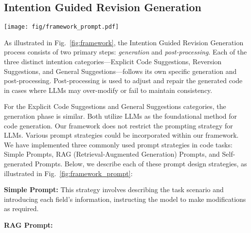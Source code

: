 
\subsection{Intention Guided Revision Generation}


\begin{figure*}[!t]
\centering
\texttt{[image: fig/framework\_prompt.pdf]}
\vspace{-2mm}
\caption{The format of the used prompt in the generation.}
\label{fig:framework_prompt}
\vspace{-4mm}
\end{figure*}

As illustrated in Fig.~\ref{fig:framework}, the Intention Guided Revision Generation process consists of two primary steps: \textit{generation} and \textit{post-processing}. Each of the three distinct intention categories—Explicit Code Suggestions, Reversion Suggestions, and General Suggestions—follows its own specific generation and post-processing. Post-processing is used to adjust and repair the generated code in cases where LLMs may over-modify or fail to maintain consistency.

For the Explicit Code Suggestions and General Suggestions categories, the generation phase is similar. Both utilize LLMs as the foundational method for code generation. Our framework does not restrict the prompting strategy for LLMs. Various prompt strategies could be incorporated within our framework. We have implemented three commonly used prompt strategies in code tasks: Simple Prompts, RAG (Retrieval-Augmented Generation) Prompts, and Self-generated Prompts. Below, we describe each of these prompt design strategies, as illustrated in Fig.~\ref{fig:framework_prompt}:

\noindent \textbf{Simple Prompt:} This strategy involves describing the task scenario and introducing each field's information, instructing the model to make modifications as required.

\noindent \textbf{RAG Prompt:} 

